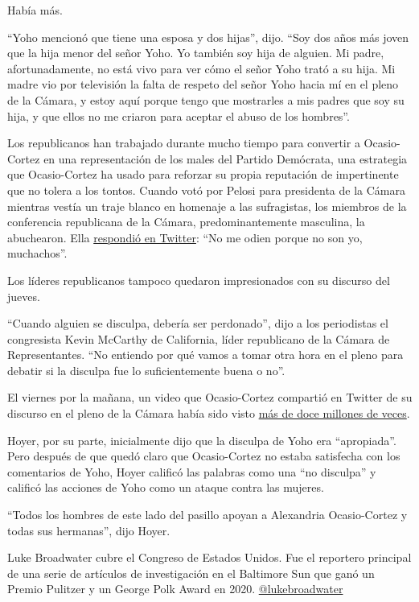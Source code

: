 Había más.

``Yoho mencionó que tiene una esposa y dos hijas'', dijo. ``Soy dos años
más joven que la hija menor del señor Yoho. Yo también soy hija de
alguien. Mi padre, afortunadamente, no está vivo para ver cómo el señor
Yoho trató a su hija. Mi madre vio por televisión la falta de respeto
del señor Yoho hacia mí en el pleno de la Cámara, y estoy aquí porque
tengo que mostrarles a mis padres que soy su hija, y que ellos no me
criaron para aceptar el abuso de los hombres''.

Los republicanos han trabajado durante mucho tiempo para convertir a
Ocasio-Cortez en una representación de los males del Partido Demócrata,
una estrategia que Ocasio-Cortez ha usado para reforzar su propia
reputación de impertinente que no tolera a los tontos. Cuando votó por
Pelosi para presidenta de la Cámara mientras vestía un traje blanco en
homenaje a las sufragistas, los miembros de la conferencia republicana
de la Cámara, predominantemente masculina, la abuchearon. Ella
\href{https://twitter.com/AOC/status/1080998665672630272}{respondió en
Twitter}: ``No me odien porque no son yo, muchachos''.

Los líderes republicanos tampoco quedaron impresionados con su discurso
del jueves.

``Cuando alguien se disculpa, debería ser perdonado'', dijo a los
periodistas el congresista Kevin McCarthy de California, líder
republicano de la Cámara de Representantes. ``No entiendo por qué vamos
a tomar otra hora en el pleno para debatir si la disculpa fue lo
suficientemente buena o no''.

El viernes por la mañana, un video que Ocasio-Cortez compartió en
Twitter de su discurso en el pleno de la Cámara había sido visto
\href{https://twitter.com/AOC/status/1286341062651523076?s=20}{más de
doce millones de veces}.

Hoyer, por su parte, inicialmente dijo que la disculpa de Yoho era
``apropiada''. Pero después de que quedó claro que Ocasio-Cortez no
estaba satisfecha con los comentarios de Yoho, Hoyer calificó las
palabras como una ``no disculpa'' y calificó las acciones de Yoho como
un ataque contra las mujeres.

``Todos los hombres de este lado del pasillo apoyan a Alexandria
Ocasio-Cortez y todas sus hermanas'', dijo Hoyer.

Luke Broadwater cubre el Congreso de Estados Unidos. Fue el reportero
principal de una serie de artículos de investigación en el Baltimore Sun
que ganó un Premio Pulitzer y un George Polk Award en 2020.
\href{https://twitter.com/lukebroadwater}{@lukebroadwater}

